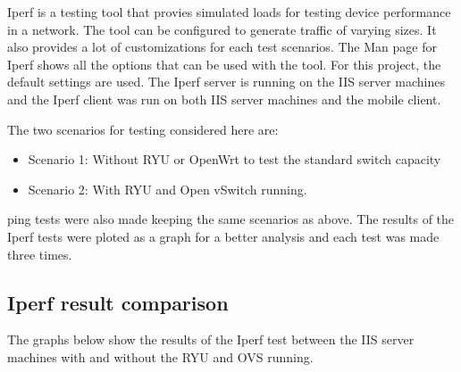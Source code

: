 Iperf is a testing tool that provies simulated loads for testing device performance in a network. The tool can be configured to generate traffic of varying sizes. It also provides a lot of customizations for each test scenarios. The Man page for Iperf shows all the options that can be used with the tool. For this project, the default settings are used. The Iperf server is running on the IIS server machines and the Iperf client was run on both IIS server machines and the mobile client.

The two scenarios for testing considered here are:
\begin{itemize}
	\item Scenario 1: Without RYU or OpenWrt to test the standard switch capacity
	\item Scenario 2: With RYU and Open vSwitch running.
\end{itemize}

ping tests were also made keeping the same scenarios as above. The results of the Iperf tests were ploted as a graph for a better analysis and each test was made three times.
%	
\subsection{Iperf result comparison}
The graphs below show the results of the Iperf test between the IIS server machines with and without the RYU and OVS running.

